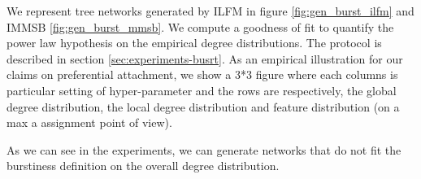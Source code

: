 We represent tree networks generated by ILFM in figure \ref{fig:gen_burst_ilfm} and IMMSB \ref{fig:gen_burst_mmsb}. We compute a goodness of fit to quantify the power law hypothesis on the empirical degree distributions. The protocol is described in section \ref{sec:experiments-busrt}. As an empirical illustration for our claims on preferential attachment, we show a 3*3 figure where each columns is particular setting of hyper-parameter and the rows are respectively, the global degree distribution, the local degree distribution and feature distribution (on a max a assignment point of view).

As we can see in the experiments, we can generate networks that do not fit the burstiness definition on the overall degree distribution.

\begin{figure}[h]
	\centering
	

\end{figure}
